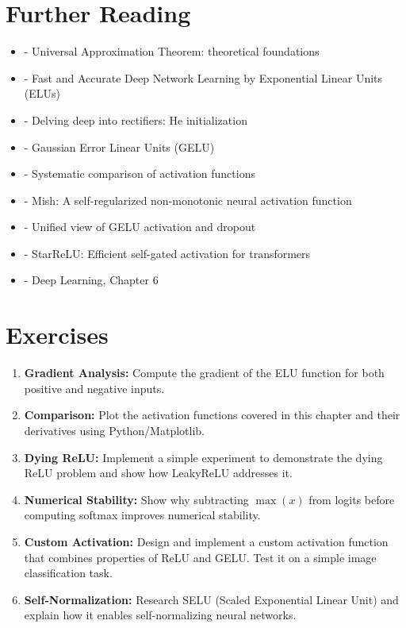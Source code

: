 \section{Further Reading}

\begin{itemize}
    \item \cite{hornik1991approximation} - Universal Approximation Theorem: theoretical foundations
    \item \cite{clevert2015fast} - Fast and Accurate Deep Network Learning by Exponential Linear Units (ELUs)
    \item \cite{he2015delving} - Delving deep into rectifiers: He initialization
    \item \cite{hendrycks2016gelu} - Gaussian Error Linear Units (GELU)
    \item \cite{ramachandran2017searching} - Systematic comparison of activation functions
    \item \cite{misra2019mish} - Mish: A self-regularized non-monotonic neural activation function
    \item \cite{clark2022unified} - Unified view of GELU activation and dropout
    \item \cite{maulik2024starrelu} - StarReLU: Efficient self-gated activation for transformers
    \item \cite{goodfellow2016deep} - Deep Learning, Chapter 6
\end{itemize}

\section{Exercises}

\begin{enumerate}
    \item \textbf{Gradient Analysis:} Compute the gradient of the ELU function for both positive and negative inputs.
    
    \item \textbf{Comparison:} Plot the activation functions covered in this chapter and their derivatives using Python/Matplotlib.
    
    \item \textbf{Dying ReLU:} Implement a simple experiment to demonstrate the dying ReLU problem and show how LeakyReLU addresses it.
    
    \item \textbf{Numerical Stability:} Show why subtracting $\max(x)$ from logits before computing softmax improves numerical stability.
    
    \item \textbf{Custom Activation:} Design and implement a custom activation function that combines properties of ReLU and GELU. Test it on a simple image classification task.
    
    \item \textbf{Self-Normalization:} Research SELU (Scaled Exponential Linear Unit) and explain how it enables self-normalizing neural networks.
\end{enumerate}
